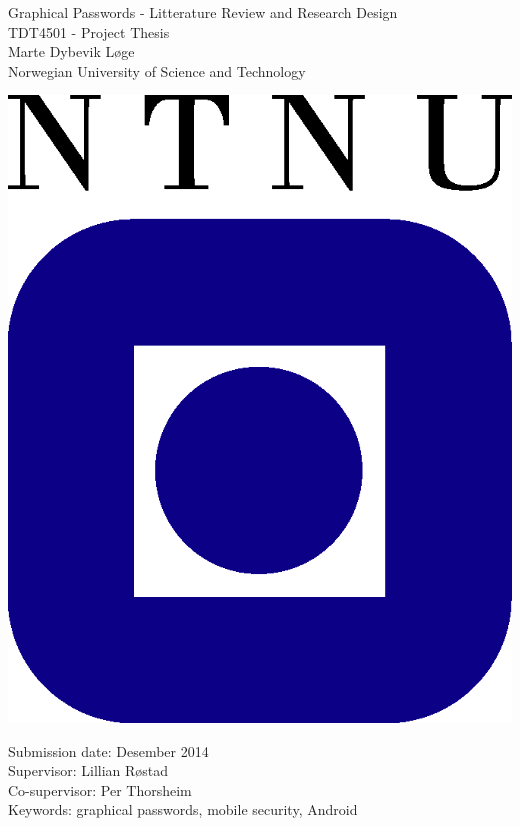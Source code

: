 \begin{titlepage}
\begin{center}

	{\Huge Graphical Passwords - Litterature Review and Research Design} \\[0.4cm]


	{\Large TDT4501 - Project Thesis} \\[2.0cm]
	{\Large Marte Dybevik Løge} \\ [0.5cm]
	{\Large Norwegian University of Science and Technology}\\

	\vspace{3.0cm}

			\includegraphics{pics/ntnu-logo2.png}

	\vspace{3.0cm}

	{\Large Submission date: Desember 2014} \\[0.2cm]
	{\Large Supervisor: Lillian Røstad} \\ [0.2cm]
	{\Large Co-supervisor: Per Thorsheim} \\ [0.2cm]
	{\Large Keywords: graphical passwords, mobile security, Android}


\end{center}
\end{titlepage}
